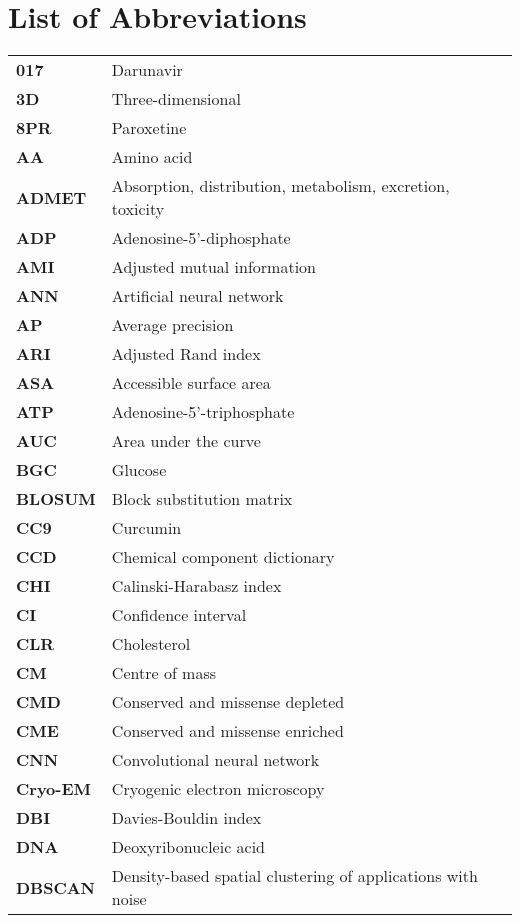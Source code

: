 \chapter*{List of Abbreviations}

\begin{longtable}[l]{@{}p{2.5cm}p{12cm}@{}}
\textbf{017} & Darunavir \\
\textbf{3D} & Three-dimensional \\
\textbf{8PR} & Paroxetine \\
\textbf{AA} & Amino acid \\
\textbf{ADMET} & Absorption, distribution, metabolism, excretion, toxicity \\
\textbf{ADP} & Adenosine-5'-diphosphate \\
\textbf{AMI} & Adjusted mutual information \\
\textbf{ANN} & Artificial neural network \\
\textbf{AP} & Average precision \\
\textbf{ARI} & Adjusted Rand index \\
\textbf{ASA} & Accessible surface area \\
\textbf{ATP} & Adenosine-5’-triphosphate \\
\textbf{AUC} & Area under the curve \\
\textbf{BGC} & Glucose \\
\textbf{BLOSUM} & Block substitution matrix \\
\textbf{CC9} & Curcumin \\
\textbf{CCD} & Chemical component dictionary \\
\textbf{CHI} & Calinski-Harabasz index \\
\textbf{CI} & Confidence interval \\
\textbf{CLR} & Cholesterol \\
\textbf{CM} & Centre of mass \\
\textbf{CMD} & Conserved and missense depleted \\
\textbf{CME} & Conserved and missense enriched \\
\textbf{CNN} & Convolutional neural network \\
\textbf{Cryo-EM} & Cryogenic electron microscopy \\
\textbf{DBI} & Davies-Bouldin index \\
\textbf{DNA} & Deoxyribonucleic acid \\
\textbf{DBSCAN} & Density-based spatial clustering of applications with noise \\

\end{longtable}
